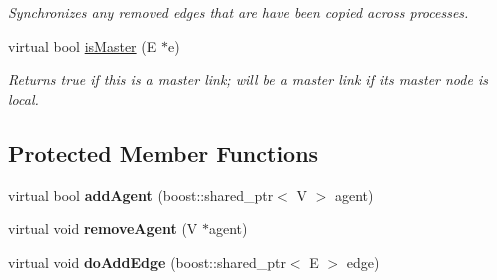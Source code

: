 \begin{DoxyCompactItemize}
\begin{DoxyCompactList}\small\item\em Synchronizes any removed edges that are have been copied across processes. \end{DoxyCompactList}\item 
virtual bool \hyperlink{classrepast_1_1_shared_network_a0a09808e13f613c58b5131e5fe7b5646}{is\-Master} (E $\ast$e)
\begin{DoxyCompactList}\small\item\em Returns true if this is a master link; will be a master link if its master node is local. \end{DoxyCompactList}\end{DoxyCompactItemize}
\subsection*{Protected Member Functions}
\begin{DoxyCompactItemize}
\item 
\hypertarget{classrepast_1_1_shared_network_a7d91463db92db8fa70f19674a2e4e83d}{virtual bool {\bfseries add\-Agent} (boost\-::shared\-\_\-ptr$<$ V $>$ agent)}\label{classrepast_1_1_shared_network_a7d91463db92db8fa70f19674a2e4e83d}

\item 
\hypertarget{classrepast_1_1_shared_network_a3ca94a03db9dd836a1d4c87491c0095c}{virtual void {\bfseries remove\-Agent} (V $\ast$agent)}\label{classrepast_1_1_shared_network_a3ca94a03db9dd836a1d4c87491c0095c}

\item 
\hypertarget{classrepast_1_1_shared_network_a700b536243250fa954cb279eb6fb300f}{virtual void {\bfseries do\-Add\-Edge} (boost\-::shared\-\_\-ptr$<$ E $>$ edge)}\label{classrepast_1_1_shared_network_a700b536243250fa954cb279eb6fb300f}

\end{DoxyCompactItemize}
